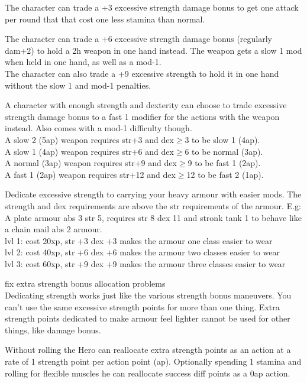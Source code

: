  The character can trade a +3 excessive strength damage bonus to get one attack per round that that cost one less stamina than normal.


 The character can trade a +6 excessive strength damage bonus (regularly dam+2) to hold a 2h weapon in one hand instead. The weapon gets a slow 1 mod when held in one hand, as well as a mod-1. \\
The character can also trade a +9 excessive strength to hold it in one hand without the slow 1 and mod-1 penalties.


 A character with enough strength and dexterity can choose to trade excessive strength damage bonus to a fast 1 modifier for the actions with the weapon instead. Also comes with a mod-1 difficulty though. \\
A slow 2 (5ap) weapon requires str+3 and dex$\geq$3 to be slow 1 (4ap).\\
A slow 1 (4ap) weapon requires str+6 and dex$\geq$6 to be normal (3ap).\\
A normal (3ap) weapon requires str+9 and dex$\geq$9 to be fast 1 (2ap).\\
A fast 1 (2ap) weapon requires str+12 and dex$\geq$12 to be fast 2 (1ap).


Dedicate excessive strength to carrying your heavy armour with easier mods. The strength and dex requirements are above the str requirements of the armour. E.g: A plate armour abs 3 str 5, requires str 8 dex 11 and stronk tank 1 to behave like a chain mail abs 2 armour. \\
lvl 1: cost 20xp, str +3 dex +3 makes the armour one class easier to wear\\
lvl 2: cost 40xp, str +6 dex +6 makes the armour two classes easier to wear\\
lvl 3: cost 60xp, str +9 dex +9 makes the armour three classes easier to wear

\noindent \todo fix extra strength bonus allocation problems \\
Dedicating strength works just like the various strength bonus maneuvers. You can't use the same excessive strength points for more than one thing. Extra strength points dedicated to make armour feel lighter cannot be used for other things, like damage bonus.


Without rolling the Hero can reallocate extra strength points as an action at a rate of 1 strength point per action point (ap). Optionally spending 1 stamina and rolling for flexible muscles he can reallocate success diff points as a 0ap action.

